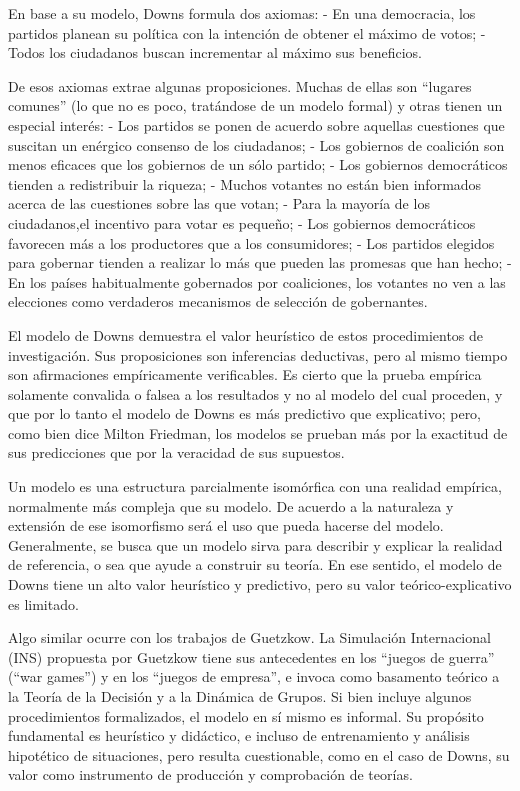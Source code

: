 \documentclass[
]{book}
\begin{document}
En base a su modelo, Downs formula dos axiomas: - En una democracia, los partidos planean su política con la intención de obtener el máximo de votos; - Todos los ciudadanos buscan incrementar al máximo sus beneficios.

De esos axiomas extrae algunas proposiciones. Muchas de ellas son ``lugares comunes'' (lo que no es poco, tratándose de un modelo formal) y otras tienen un especial interés: - Los partidos se ponen de acuerdo sobre aquellas cuestiones que suscitan un enérgico consenso de los ciudadanos; - Los gobiernos de coalición son menos eficaces que los gobiernos de un sólo partido; - Los gobiernos democráticos tienden a redistribuir la riqueza; - Muchos votantes no están bien informados acerca de las cuestiones sobre las que votan; - Para la mayoría de los ciudadanos,el incentivo para votar es pequeño; - Los gobiernos democráticos favorecen más a los productores que a los consumidores; - Los partidos elegidos para gobernar tienden a realizar lo más que pueden las promesas que han hecho; - En los países habitualmente gobernados por coaliciones, los votantes no ven a las elecciones como verdaderos mecanismos de selección de gobernantes.

El modelo de Downs demuestra el valor heurístico de estos procedimientos de investigación. Sus proposiciones son inferencias deductivas, pero al mismo tiempo son afirmaciones empíricamente verificables. Es cierto que la prueba empírica solamente convalida o falsea a los resultados y no al modelo del cual proceden, y que por lo tanto el modelo de Downs es más predictivo que explicativo; pero, como bien dice Milton Friedman, los modelos se prueban más por la exactitud de sus predicciones que por la veracidad de sus supuestos.

Un modelo es una estructura parcialmente isomórfica con una realidad empírica, normalmente más compleja que su modelo. De acuerdo a la naturaleza y extensión de ese isomorfismo será el uso que pueda hacerse del modelo. Generalmente, se busca que un modelo sirva para describir y explicar la realidad de referencia, o sea que ayude a construir su teoría. En ese sentido, el modelo de Downs tiene un alto valor heurístico y predictivo, pero su valor teórico-explicativo es limitado.

Algo similar ocurre con los trabajos de Guetzkow. La Simulación Internacional (INS) propuesta por Guetzkow tiene sus antecedentes en los ``juegos de guerra'' (``war games'') y en los ``juegos de empresa'', e invoca como basamento teórico a la Teoría de la Decisión y a la Dinámica de Grupos. Si bien incluye algunos procedimientos formalizados, el modelo en sí mismo es informal. Su propósito fundamental es heurístico y didáctico, e incluso de entrenamiento y análisis hipotético de situaciones, pero resulta cuestionable, como en el caso de Downs, su valor como instrumento de producción y comprobación de teorías.
\end{document}
